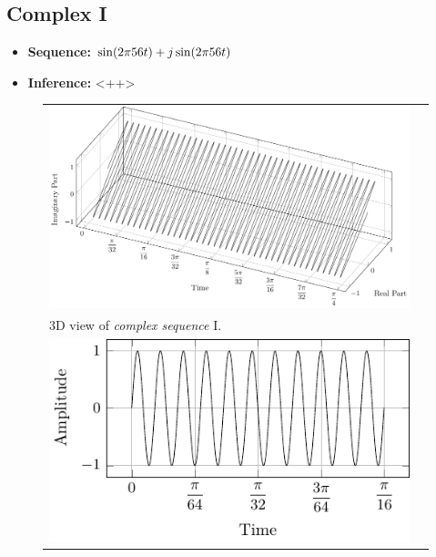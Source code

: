 \documentclass[../../course]{subfiles}
\begin{document}
\subsection{Complex I}

\begin{itemize} [label=]

    \item \textbf{Sequence:} $\sin(2 \pi 56 t) + j \sin(2 \pi 56 t)$

    \item \textbf{Inference:} <++>

\end{itemize}

\begin{figure} [H]

    \renewcommand{\arraystretch}{0.75}
    \centering
    \begin{NiceTabularX} {\textwidth} {
            *{2}{>{\centering\arraybackslash}X}
        }

         {
             {
                \includegraphics[height = \textheight] {tikzpics/plotComplexI.pdf}
            }
        }

        &
        \\

         {
            \vbox{
                 {3D view of \emph{complex sequence} I.}
                \label{plt:cmplxI}
            }
        }

        &
        \\

         {
             {
                \includegraphics[height = \textheight] {tikzpics/plotShortX3.pdf}
            }
        }


\end{NiceTabularX}
\end{figure}
\end{document}
